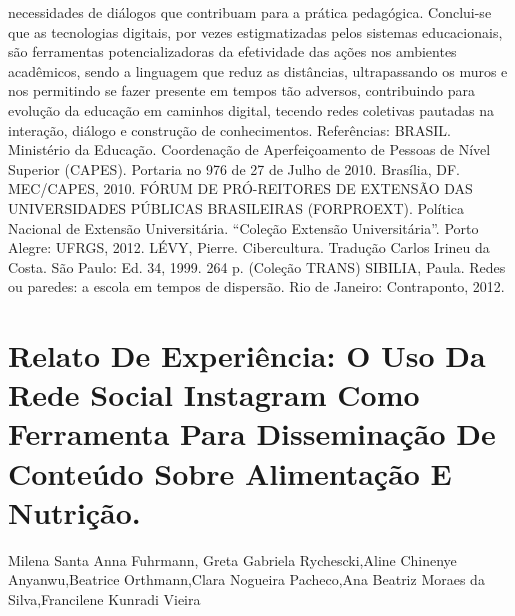 necessidades de diálogos que contribuam para a prática pedagógica.
Conclui-se que as tecnologias digitais, por vezes estigmatizadas pelos sistemas
educacionais, são ferramentas potencializadoras da efetividade das ações nos ambientes
acadêmicos, sendo a linguagem que reduz as distâncias, ultrapassando os muros e nos permitindo
se fazer presente em tempos tão adversos, contribuindo para evolução da educação em caminhos
digital, tecendo redes coletivas pautadas na interação, diálogo e construção de conhecimentos.
Referências:
BRASIL. Ministério da Educação. Coordenação de Aperfeiçoamento de Pessoas de Nível
Superior (CAPES). Portaria no 976 de 27 de Julho de 2010. Brasília, DF. MEC/CAPES,
2010.
FÓRUM DE PRÓ-REITORES DE EXTENSÃO DAS UNIVERSIDADES PÚBLICAS
BRASILEIRAS (FORPROEXT). Política Nacional de Extensão Universitária. “Coleção
Extensão Universitária”. Porto Alegre: UFRGS, 2012.
LÉVY, Pierre. Cibercultura. Tradução Carlos Irineu da Costa. São Paulo: Ed. 34, 1999. 264 p.
(Coleção TRANS)
SIBILIA, Paula. Redes ou paredes: a escola em tempos de dispersão. Rio de Janeiro:
Contraponto, 2012.




\section*{Relato De Experiência: O Uso Da Rede Social Instagram Como Ferramenta Para Disseminação De Conteúdo Sobre Alimentação E Nutrição.}

Milena Santa Anna Fuhrmann, Greta Gabriela Rychescki,Aline Chinenye Anyanwu,Beatrice Orthmann,Clara Nogueira Pacheco,Ana Beatriz Moraes da Silva,Francilene Kunradi Vieira

